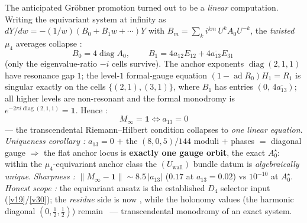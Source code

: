 \documentclass[11pt,a4paper]{article}
\begin{document}
\begin{keybox}[The resonance theorem: $M_\infty=\mathbf1\iff a_{13}=0$ --- one gauge orbit \mE\ (\veri{v116\_resonance\_uniqueness.py})]
The anticipated Gr\"obner promotion turned out to be a \emph{linear} computation. Writing the
equivariant system at infinity as $dY/dw=-(1/w)(B_0+B_1w+\cdots)Y$ with
$B_m=\sum_k i^{km}\,U^kA_0U^{-k}$, the \emph{twisted} $\mu_4$ averages collapse \mE:
\[
  B_0=4\operatorname{diag}A_0,\qquad
  \boxed{\ B_1=4a_{12}E_{12}+4\overline{a_{13}}E_{31}\ }
\]
(only the eigenvalue-ratio $-i$ cells survive). The anchor exponents $\operatorname{diag}(2,1,1)$ have
resonance gap $1$; the level-$1$ formal-gauge equation $(1-\operatorname{ad}R_0)H_1=R_1$ is singular
exactly on the cells $\{(2,1),(3,1)\}$, where $B_1$ has entries $(0,\,4\overline{a_{13}})$; all higher
levels are non-resonant and the formal monodromy is $e^{-2\pi i\operatorname{diag}(2,1,1)}=\mathbf1$.
Hence \mE:
\[
  \boxed{\ M_\infty=\mathbf1\iff a_{13}=0\ }
\]
--- the transcendental Riemann--Hilbert condition collapses to \emph{one linear equation}.
\emph{Uniqueness corollary \mE:} $a_{13}=0$ $+$ the $(8,0,5)/144$ moduli $+$ phases $=$ diagonal gauge
$\Rightarrow$ the flat anchor locus is \textbf{exactly one gauge orbit}, the exact $A_0^\star$: within
the $\mu_4$-equivariant anchor class the $(U_{\mathrm{wall}})$ bundle datum is \emph{algebraically
unique}. \emph{Sharpness \mE:} $\|M_\infty-\mathbf1\|\sim8.5\,|a_{13}|$ ($0.17$ at $a_{13}=0.02$) vs
$10^{-10}$ at $A_0^\star$. \emph{Honest scope \mC:} the equivariant ansatz is the established $D_4$
selector input (\vref{v19}/\vref{v30}); the \emph{residue} side is now \mE, while the holonomy values (the harmonic
diagonal $(0,\tfrac12,\tfrac12)$) remain \mE\ --- transcendental monodromy of an exact system.
\end{keybox}
\end{document}
